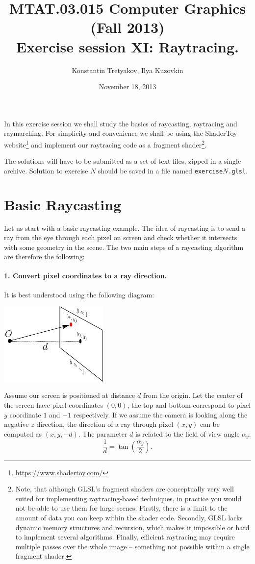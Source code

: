 \documentclass{article}
\begin{document}
\title{MTAT.03.015 Computer Graphics (Fall 2013)\\
Exercise session XI: Raytracing.}
\author{Konstantin Tretyakov, Ilya Kuzovkin}
\date{November 18, 2013}
\maketitle

In this exercise session we shall study the basics of raycasting, raytracing and raymarching. For simplicity and convenience we shall be using the ShaderToy website\footnote{\url{https://www.shadertoy.com/}} and implement our raytracing code as a fragment shader\footnote{Note, that although GLSL's fragment shaders are conceptually very well suited for implementing raytracing-based techniques, in practice you would not be able to use them for large scenes. Firstly, there is a limit to the amount of data you can keep within the shader code. Secondly, GLSL lacks dynamic memory structures and recursion, which makes it impossible or hard to implement several algorithms. Finally, efficient raytracing may require multiple passes over the whole image -- something not possible within a single fragment shader.}.

The solutions will have to be submitted as a set of text files, zipped in a single archive. Solution to exercise $N$ should be saved in a file named \texttt{exercise}$N$\texttt{.glsl}.

\section{Basic Raycasting}
Let us start with a basic raycasting example. The idea of raycasting is to send a ray from the eye through each pixel on screen and check whether it intersects with some geometry in the scene. The two main steps of a raycasting algorithm are therefore the following:
\paragraph{1. Convert pixel coordinates to a ray direction.}
It is best understood using the following diagram:
\begin{center}
\includegraphics[width=0.4\textwidth]{fig1.png}
\end{center}
Assume our screen is positioned at distance $d$ from the origin. Let the center of the screen have pixel coordinates $(0, 0)$, the top and bottom correspond to pixel $y$ coordinate $1$ and $-1$ respectively. If we assume the camera is looking along the negative $z$ direction, the direction of a ray through pixel $(x,y)$ can be computed as $(x, y, -d)$. The parameter $d$ is related to the field of view angle $\alpha_y$:
$$\frac{1}{d} = \tan\left(\frac{\alpha_y}{2}\right).
$$
\end{document}
